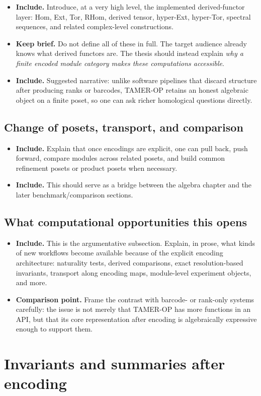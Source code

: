 \documentclass[11pt]{article}
\newcommand{\TAMER}{\textsc{TAMER-OP}}
\newenvironment{plan}{\begin{itemize}[leftmargin=1.6em,itemsep=0.35em,topsep=0.25em]}{\end{itemize}}
\newcommand{\includeitems}[1]{\item \textbf{Include.} #1}
\newcommand{\keepbrief}[1]{\item \textbf{Keep brief.} #1}
\newcommand{\compare}[1]{\item \textbf{Comparison point.} #1}
\begin{document}
\begin{plan}
    \includeitems{Introduce, at a very high level, the implemented derived-functor layer: Hom, Ext, Tor, RHom, derived tensor, hyper-Ext, hyper-Tor, spectral sequences, and related complex-level constructions.}
    \keepbrief{Do not define all of these in full. The target audience already knows what derived functors are. The thesis should instead explain \emph{why a finite encoded module category makes these computations accessible}.}
    \includeitems{Suggested narrative: unlike software pipelines that discard structure after producing ranks or barcodes, \TAMER{} retains an honest algebraic object on a finite poset, so one can ask richer homological questions directly.}
\end{plan}

\subsection{Change of posets, transport, and comparison}

\begin{plan}
    \includeitems{Explain that once encodings are explicit, one can pull back, push forward, compare modules across related posets, and build common refinement posets or product posets when necessary.}
    \includeitems{This should serve as a bridge between the algebra chapter and the later benchmark/comparison sections.}
\end{plan}

\subsection{What computational opportunities this opens}

\begin{plan}
    \includeitems{This is the argumentative subsection. Explain, in prose, what kinds of new workflows become available because of the explicit encoding architecture: naturality tests, derived comparisons, exact resolution-based invariants, transport along encoding maps, module-level experiment objects, and more.}
    \compare{Frame the contrast with barcode- or rank-only systems carefully: the issue is not merely that \TAMER{} has more functions in an API, but that its core representation after encoding is algebraically expressive enough to support them.}
\end{plan}

\section{Invariants and summaries after encoding}\label{sec:invariants}
\end{document}
